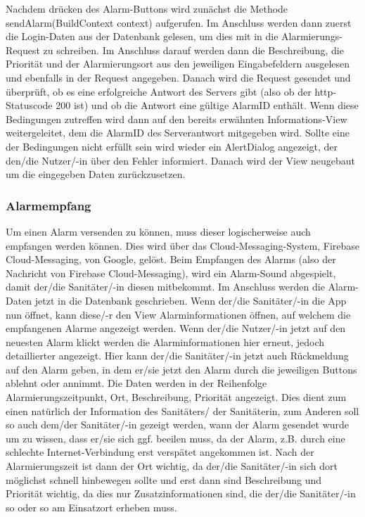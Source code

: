     Nachdem drücken des Alarm-Buttons wird zunächst die Methode sendAlarm(BuildContext context)
    aufgerufen. Im Anschluss werden dann zuerst die Login-Daten aus der Datenbank gelesen, 
    um dies mit in die Alarmierungs-Request zu schreiben. Im Anschluss darauf werden dann die 
    Beschreibung, die Priorität und der Alarmierungsort aus den jeweiligen Eingabefeldern 
    ausgelesen und ebenfalls in der Request angegeben. Danach wird die Request gesendet und 
    überprüft, ob es eine erfolgreiche Antwort des Servers gibt (also ob der http-Statuscode 
    200 ist) und ob die Antwort eine gültige AlarmID enthält. Wenn diese Bedingungen zutreffen 
    wird dann auf den bereits erwähnten Informations-View weitergeleitet, dem die AlarmID des 
    Serverantwort mitgegeben wird. Sollte eine der Bedingungen nicht erfüllt sein wird wieder 
    ein AlertDialog angezeigt, der den/die Nutzer/-in über den Fehler informiert. Danach wird 
    der View neugebaut um die eingegeben Daten zurückzusetzen.

\subsubsection{Alarmempfang}
    Um einen Alarm versenden zu können, muss dieser logischerweise auch empfangen 
    werden können. Dies wird über das Cloud-Messaging-System, Firebase 
    Cloud-Messaging, von Google, gelöst. Beim Empfangen des Alarms (also der 
    Nachricht von Firebase Cloud-Messaging), wird ein Alarm-Sound abgespielt, damit 
    der/die Sanitäter/-in diesen mitbekommt. Im Anschluss werden die Alarm-Daten jetzt
    in die Datenbank geschrieben. Wenn der/die Sanitäter/-in die App nun öffnet, kann
    diese/-r den View \glqq Alarminformationen \grqq öffnen, auf welchem die empfangenen
    Alarme angezeigt werden. Wenn der/die Nutzer/-in jetzt auf den neuesten Alarm 
    klickt werden die Alarminformationen hier erneut, jedoch detaillierter angezeigt.
    Hier kann der/die Sanitäter/-in jetzt auch Rückmeldung auf den Alarm geben, in 
    dem er/sie jetzt den Alarm durch die jeweiligen Buttons ablehnt oder annimmt.
    Die Daten werden in der Reihenfolge Alarmierungszeitpunkt, Ort, Beschreibung, 
    Priorität angezeigt. Dies dient zum einen natürlich der Information des 
    Sanitäters/ der Sanitäterin, zum Anderen soll so auch dem/der Sanitäter/-in 
    gezeigt werden, wann der Alarm gesendet wurde um zu wissen, dass er/sie sich ggf. 
    beeilen muss, da der Alarm, z.B. durch eine schlechte Internet-Verbindung erst 
    verspätet angekommen ist. Nach der Alarmierungszeit ist dann der Ort wichtig, da 
    der/die Sanitäter/-in sich dort möglichst schnell hinbewegen sollte und erst dann 
    sind Beschreibung und Priorität wichtig, da dies nur Zusatzinformationen sind, 
    die der/die Sanitäter/-in so oder so am Einsatzort erheben muss.


